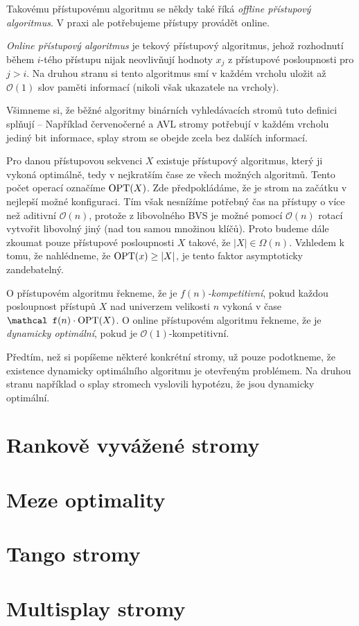 Takovému přístupovému algoritmu se někdy také říká \emph{offline přístupový
algoritmus}. V praxi ale potřebujeme přístupy provádět online.

\begin{definice}
\emph{Online přístupový algoritmus} je tekový přístupový algoritmus, jehož
rozhodnutí během $i$-tého přístupu nijak neovlivňují hodnoty $x_j$ z přístupové
posloupnosti pro $j>i$. Na druhou stranu si tento algoritmus smí v každém
vrcholu uložit až $\mathcal O(1)$ slov paměti informací (nikoli však ukazatele
na vrcholy).  
\end{definice}

Všimneme si, že běžné algoritmy binárních vyhledávacích stromů tuto definici
splňují -- Například červenočerné a AVL stromy potřebují v každém vrcholu
jediný bit informace, splay strom se obejde zcela bez dalších informací.

Pro danou přístupovou sekvenci $X$ existuje přístupový algoritmus, který ji
vykoná optimálně, tedy v nejkratším čase ze všech možných algoritmů. Tento
počet operací označíme $\operatorname{OPT}(X)$. Zde předpokládáme, že je strom na začátku v
nejlepší možné konfiguraci. Tím však nesnížíme potřebný čas na přístupy o více
než aditivní $\mathcal O(n)$, protože z libovolného BVS je možné pomocí
$\mathcal O(n)$ rotací vytvořit libovolný jiný (nad tou samou množinou klíčů).
Proto budeme dále zkoumat pouze přístupové posloupnosti $X$ takové, že $|X| \in
\Omega(n)$. Vzhledem k tomu, že nahlédneme, že $\operatorname{OPT}(x)\geq |X|$, je tento
faktor asymptoticky zandebatelný. 


\begin{definice}
O přístupovém algoritmu řekneme, že je \emph{$f(n)$-kompetitivní}, pokud každou
posloupnost přístupů $X$ nad univerzem velikosti $n$ vykoná v čase $\mathcal
f(n)\cdot\opt(X)$. O online přístupovém algoritmu řekneme, že je
\emph{dynamicky optimální}, pokud je $\mathcal O(1)$-kompetitivní.
\end{definice}

Předtím, než si popíšeme některé konkrétní stromy, už pouze podotkneme, že
existence dynamicky optimálního algoritmu je otevřeným problémem. Na druhou
stranu například o splay stromech vyslovili \citet{splay} hypotézu, že jsou
dynamicky optimální.

\section{Rankově vyvážené stromy}

\section{Meze optimality}

\section{Tango stromy}

\section{Multisplay stromy}
